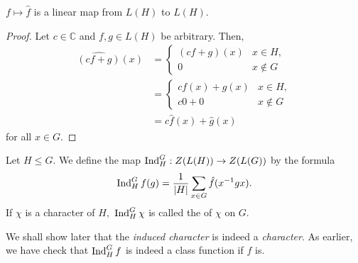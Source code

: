 \begin{lem} \label{lem:overdotislinear}
	$f \mapsto \hat{f}$ is a linear map from $L(H)$ to $L(H).$
\end{lem}
\begin{proof} 
	Let $c \in \mathbb{C}$ and $f, g \in L(H)$ be arbitrary. Then,
	\begin{align*} 
		\widehat{(cf + g)}(x) &= \begin{cases}
			(cf + g)(x) & x \in H,\\
			0 & x \notin G
		\end{cases}\\
		&= \begin{cases}
			cf(x) + g(x) & x \in H,\\
			c0 + 0 & x \notin G
		\end{cases}\\
		&= c\hat{f}(x) + \hat{g}(x)
	\end{align*}
	for all $x \in G.$
\end{proof}

\begin{defn}%
	Let $H \le G.$ We define the  map $\operatorname{Ind}^{G}_{H} : Z(L(H)) \to Z(L(G))$ by the formula
	\begin{equation*} 
		\operatorname{Ind}^{G}_{H}f(g) = \frac{1}{{\left\lvert H \right\lvert}}\sum_{x \in G} \hat{f}(x^{-1}gx).
	\end{equation*}
	If $\chi$ is a character of $H,$ $\operatorname{Ind}^{G}_{H}\chi$ is called the  of $\chi$ on $G.$
\end{defn}

We shall show later that the \emph{induced character} is indeed a \emph{character}.	As earlier, we have check that $\operatorname{Ind}^{G}_{H}f$ is indeed a class function if $f$ is.


